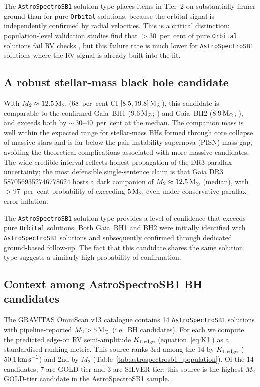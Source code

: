\documentclass[usenatbib,fleqn]{mnras}
\newcommand{\Msun}{{\rm M}_\odot}
\newcommand{\kms}{{\rm km\,s}^{-1}}
\begin{document}
\noindent
The \texttt{AstroSpectroSB1} solution type places items in Tier~2
on substantially firmer ground than for pure \texttt{Orbital}
solutions, because the orbital signal is independently confirmed
by radial velocities.  This is a critical distinction:
population-level validation studies find that $> 30$~per~cent of
pure \texttt{Orbital} solutions fail RV checks
\citep{ElBadry2024}, but this failure rate is much lower for
\texttt{AstroSpectroSB1} solutions where the RV signal is
already built into the fit.

\subsection{A robust stellar-mass black hole candidate}

With $M_2 \approx 12.5\,\Msun$ (68~per~cent CI
$[8.5, 19.8]\,\Msun$), this candidate is comparable to
the confirmed Gaia~BH1 ($9.6\,\Msun$; \citealt{ElBadry2023a}) and
Gaia~BH2 ($8.9\,\Msun$; \citealt{ElBadry2023b}), and exceeds both
by $\sim$\,$30$--$40$~per~cent at the median.  The companion mass
is well within the expected range for stellar-mass BHs formed
through core collapse of massive stars \citep{Fryer2012,
Belczynski2020} and is far below the pair-instability supernova
(PISN) mass gap, avoiding the theoretical complications
associated with more massive candidates.
The wide credible interval reflects honest propagation of the
DR3 parallax uncertainty; the most defensible single-sentence
claim is that Gaia DR3 5870569352746778624 hosts a dark
companion of $M_2 \approx 12.5\,\Msun$ (median), with
$>$97~per~cent probability of exceeding $5\,\Msun$ even
under conservative parallax-error inflation.

The \texttt{AstroSpectroSB1} solution type provides a level of
confidence that exceeds pure \texttt{Orbital} solutions.  Both
Gaia~BH1 and BH2 were initially identified with
\texttt{AstroSpectroSB1} solutions and subsequently confirmed
through dedicated ground-based follow-up.  The fact that this
candidate shares the same solution type suggests a similarly
high probability of confirmation.

\subsection{Context among AstroSpectroSB1 BH candidates}
\label{sec:discussion:population}

The GRAVITAS OmniScan v13 catalogue contains 14
\texttt{AstroSpectroSB1} solutions with pipeline-reported
$M_2 > 5\,\Msun$ (i.e.\ BH candidates).  For each we compute
the predicted edge-on RV semi-amplitude $K_{1,\rm edge}$
(equation~\ref{eq:K1}) as a standardised ranking metric.
This source ranks 3rd among the 14 by $K_{1,\rm edge}$
($50.1\,\kms$) and 2nd by $M_2$
(Table~\ref{tab:astrospectrosb1_population}).
Of the 14 candidates, 7 are GOLD-tier and 3 are SILVER-tier;
this source is the highest-$M_2$ GOLD-tier candidate in the
AstroSpectroSB1 sample.
\end{document}
